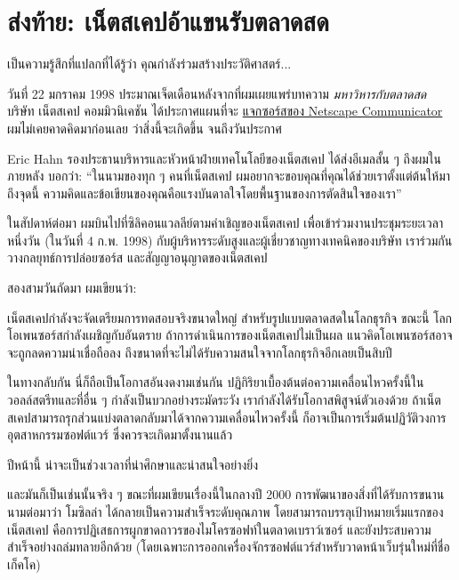 \chapter{ส่งท้าย: เน็ตสเคปอ้าแขนรับตลาดสด}

เป็นความรู้สึกที่แปลกที่ได้รู้ว่า คุณกำลังร่วมสร้างประวัติศาสตร์...

วันที่ 22 มกราคม 1998 ประมาณเจ็ดเดือนหลังจากที่ผมเผยแพร่บทความ
\emph{มหาวิหารกับตลาดสด} บริษัท เน็ตสเคป คอมมิวนิเคชัน ได้ประกาศแผนที่จะ
\href{http://www.netscape.com/newsref/pr/newsrelease558.html}{แจกซอร์สของ
  Netscape Communicator} ผมไม่เคยคาดคิดมาก่อนเลย ว่าสิ่งนี้จะเกิดขึ้น
จนถึงวันประกาศ

Eric Hahn รองประธานบริหารและหัวหน้าฝ่ายเทคโนโลยีของเน็ตสเคป
ได้ส่งอีเมลสั้น ๆ  ถึงผมในภายหลัง บอกว่า: ``ในนามของทุก ๆ  คนที่เน็ตสเคป
ผมอยากจะขอบคุณที่คุณได้ช่วยเราตั้งแต่ต้นให้มาถึงจุดนี้
ความคิดและข้อเขียนของคุณคือแรงบันดาลใจโดยพื้นฐานของการตัดสินใจของเรา''

ในสัปดาห์ต่อมา ผมบินไปที่ซิลิคอนแวลลีย์ตามคำเชิญของเน็ตสเคป
เพื่อเข้าร่วมงานประชุมระยะเวลาหนึ่งวัน (ในวันที่ 4 ก.พ. 1998)
กับผู้บริหารระดับสูงและผู้เชี่ยวชาญทางเทคนิคของบริษัท
เราร่วมกันวางกลยุทธ์การปล่อยซอร์ส และสัญญาอนุญาตของเน็ตสเคป

\noindent สองสามวันถัดมา ผมเขียนว่า:

\begin{fancyquotes}
  เน็ตสเคปกำลังจะจัดเตรียมการทดสอบจริงขนาดใหญ่
  สำหรับรูปแบบตลาด\-สดในโลกธุรกิจ ขณะนี้
  โลกโอเพนซอร์สกำลังเผชิญกับอันตราย
  ถ้าการดำเนินการของเน็ตสเคปไม่เป็นผล
  แนวคิดโอเพนซอร์สอาจจะถูกลดความน่าเชื่อถือลง
  ถึงขนาดที่จะไม่ได้รับความสนใจจากโลกธุรกิจอีกเลยเป็นสิบปี

  ในทางกลับกัน นี่ก็ถือเป็นโอกาสอันงดงามเช่นกัน
  ปฏิกิริยาเบื้องต้นต่อความเคลื่อนไหวครั้งนี้ในวอลล์สตรีทและที่อื่น ๆ
  กำลังเป็นบวกอย่างระมัดระวัง เรากำลังได้รับโอกาสพิสูจน์ตัวเองด้วย
  ถ้าเน็ตสเคปสามารถรุกส่วนแบ่งตลาดกลับมาได้จากความเคลื่อนไหวครั้งนี้
  ก็อาจเป็นการเริ่มต้นปฏิวัติวงการอุตสาหกรรมซอฟต์แวร์
  ซึ่งควรจะเกิดมาตั้งนานแล้ว

  ปีหน้านี้ น่าจะเป็นช่วงเวลาที่น่าศึกษาและน่าสนใจอย่างยิ่ง
\end{fancyquotes}

และมันก็เป็นเช่นนั้นจริง ๆ  ขณะที่ผมเขียนเรื่องนี้ในกลางปี 2000
การพัฒนาของสิ่งที่ได้รับการขนานนามต่อมาว่า โมซิลล่า
ได้กลายเป็นความสำเร็จระดับคุณภาพ
โดยสามารถบรรลุเป้าหมายเริ่มแรกของเน็ตสเคป
คือการปฏิเสธการผูกขาดถาวรของไมโครซอฟท์ในตลาดเบราว์เซอร์
และยังประสบความสำเร็จอย่างถล่มทลายอีกด้วย
(โดยเฉพาะการออกเครื่องจักรซอฟต์แวร์สำหรับวาดหน้าเว็บรุ่นใหม่ที่ชื่อ
เก็คโค)

